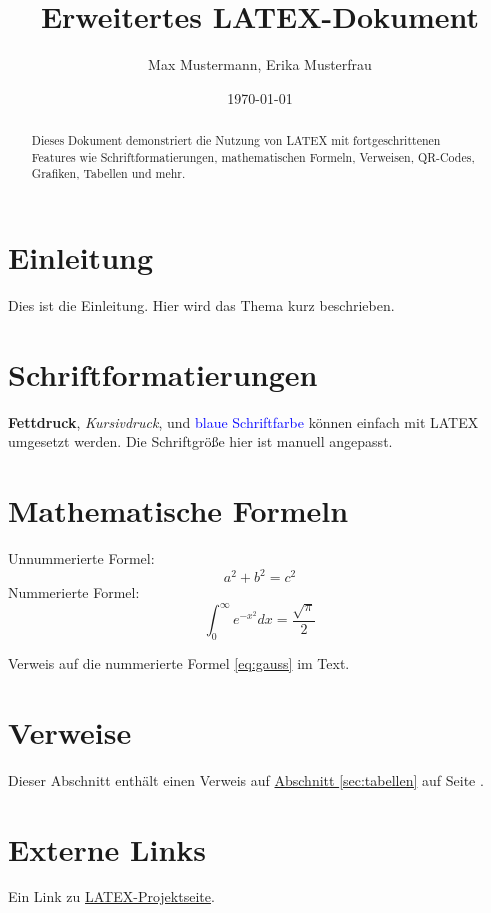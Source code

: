 \documentclass[a4paper,12pt]{article}
\begin{document}
\title{Erweitertes LATEX-Dokument}
\author{Max Mustermann, Erika Musterfrau}
\date{\today}
\maketitle

\begin{abstract}
Dieses Dokument demonstriert die Nutzung von LATEX mit fortgeschrittenen Features wie Schriftformatierungen, mathematischen Formeln, Verweisen, QR-Codes, Grafiken, Tabellen und mehr.
\end{abstract}

\tableofcontents
\newpage

\listoffigures
\newpage

\section{Einleitung}
Dies ist die Einleitung. Hier wird das Thema kurz beschrieben.

\section{Schriftformatierungen}
\textbf{Fettdruck}, \textit{Kursivdruck}, und \textcolor{blue}{blaue Schriftfarbe} können einfach mit LATEX umgesetzt werden. Die Schriftgröße hier ist \Large manuell angepasst.

\section{Mathematische Formeln}
Unnummerierte Formel:
\[
a^2 + b^2 = c^2
\]
Nummerierte Formel:
\begin{equation}
\int_{0}^{\infty} e^{-x^2} dx = \frac{\sqrt{\pi}}{2}
\label{eq:gauss}
\end{equation}

Verweis auf die nummerierte Formel \eqref{eq:gauss} im Text.

\section{Verweise}
Dieser Abschnitt enthält einen Verweis auf \hyperref[sec:tabellen]{Abschnitt \ref*{sec:tabellen}} auf Seite \pageref{sec:tabellen}.

\section{Externe Links}
Ein Link zu \href{https://www.latex-project.org}{LATEX-Projektseite}.
\end{document}
